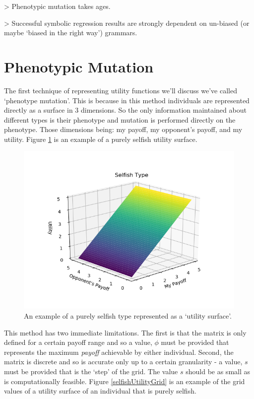 \documentclass[11pt]{book}
\newcommand*{\np}{\par\noindent\newline}
\begin{document}
\noindent> Phenotypic mutation takes ages.

\noindent> Successful symbolic regression results are strongly dependent on un-biased (or maybe `biased in the right way') grammars.


\section{Phenotypic Mutation}
The first technique of representing utility functions we'll discuss we've called `phenotype mutation'.
This is because in this method individuals are represented directly as a surface in 3 dimensions.
So the only information maintained about different types is their phenotype and mutation is performed directly on the phenotype.
Those dimensions being: my payoff, my opponent's payoff, and my utility.
Figure \ref{selfishUtilitySurface} is an example of a purely selfish utility surface.

\begin{figure}
	\centering
	\includegraphics[scale=0.75]{resources/selfish.png}
	\caption{An example of a purely selfish type represented as a `utility surface'.}
	\label{selfishUtilitySurface}
\end{figure}

\np This method has two immediate limitations. 
The first is that the matrix is only defined for a certain payoff range and so a value, $\phi$ must be provided that represents the maximum \textit{payoff} achievable by either individual.
Second, the matrix is discrete and so is accurate only up to a certain granularity - a value, $s$ must be provided that is the `step' of the grid.
The value $s$ should be as small as is computationally feasible. 
Figure \ref{selfishUtilityGrid} is an example of the grid values of a utility surface of an individual that is purely selfish.
\end{document}
